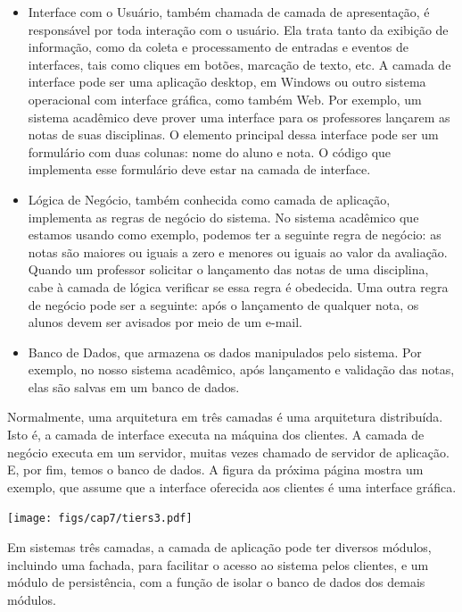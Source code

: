 \documentclass[
  11pt,
  twoside]{book}
\let\origfigure\figure
\let\endorigfigure\endfigure
\renewenvironment{figure}[1][2] {
    \expandafter\origfigure\expandafter[!h]
} {
    \endorigfigure
}
\begin{document}
\begin{itemize}
\item
  Interface com o Usuário, também chamada de camada de apresentação, é
  responsável por toda interação com o usuário. Ela trata tanto da
  exibição de informação, como da coleta e processamento de entradas e
  eventos de interfaces, tais como cliques em botões, marcação de texto,
  etc. A camada de interface pode ser uma aplicação desktop, em Windows
  ou outro sistema operacional com interface gráfica, como também Web.
  Por exemplo, um sistema acadêmico deve prover uma interface para os
  professores lançarem as notas de suas disciplinas. O elemento
  principal dessa interface pode ser um formulário com duas colunas:
  nome do aluno e nota. O código que implementa esse formulário deve
  estar na camada de interface.
\item
  Lógica de Negócio, também conhecida como camada de aplicação,
  implementa as regras de negócio do sistema. No sistema acadêmico que
  estamos usando como exemplo, podemos ter a seguinte regra de negócio:
  as notas são maiores ou iguais a zero e menores ou iguais ao valor da
  avaliação. Quando um professor solicitar o lançamento das notas de uma
  disciplina, cabe à camada de lógica verificar se essa regra é
  obedecida. Uma outra regra de negócio pode ser a seguinte: após o
  lançamento de qualquer nota, os alunos devem ser avisados por meio de
  um e-mail.
\item
  Banco de Dados, que armazena os dados manipulados pelo sistema. Por
  exemplo, no nosso sistema acadêmico, após lançamento e validação das
  notas, elas são salvas em um banco de dados.
\end{itemize}

Normalmente, uma arquitetura em três camadas é uma arquitetura
distribuída. Isto é, a camada de interface executa na máquina dos
clientes. A camada de negócio executa em um servidor, muitas vezes
chamado de servidor de aplicação. E, por fim, temos o banco de dados. A
figura da próxima página mostra um exemplo, que assume que a interface
oferecida aos clientes é uma interface gráfica.

\begin{figure}
\centering
\texttt{[image: figs/cap7/tiers3.pdf]}
\caption{Arquitetura em três camadas}
\end{figure}

Em sistemas três camadas, a camada de aplicação pode ter diversos
módulos, incluindo uma fachada, para facilitar o acesso ao sistema pelos
clientes, e um módulo de persistência, com a função de isolar o banco de
dados dos demais módulos.
\end{document}
